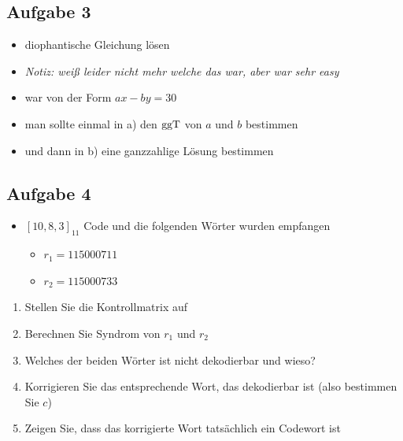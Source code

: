 \subsection{Aufgabe 3}
\begin{aufgabe}[Aufgabe 3]
\begin{itemize}
  \item diophantische Gleichung lösen
  \item \textit{Notiz: weiß leider nicht mehr welche das war, aber war sehr easy}
  \item war von der Form $a x - b y = 30$
  \item man sollte einmal in a) den $\operatorname{ggT}$ von $a$ und $b$ bestimmen
  \item und dann in b) eine ganzzahlige Lösung bestimmen
\end{itemize}
\end{aufgabe}

\subsection{Aufgabe 4}
\begin{aufgabe}[Aufgabe 4]
\begin{itemize}
  \item $[10, 8, 3]_{11}$ Code und die folgenden Wörter wurden empfangen
  \begin{itemize}
    \item $r_1 = 115000711$
    \item $r_2 = 115000733$
  \end{itemize}
\end{itemize}
\begin{enumerate}
  \item[a)] Stellen Sie die Kontrollmatrix auf
  \item[b)] Berechnen Sie Syndrom von $r_1$ und $r_2$
  \item[c)] Welches der beiden Wörter ist nicht dekodierbar und wieso?
  \item[d)] Korrigieren Sie das entsprechende Wort, das dekodierbar ist (also bestimmen Sie $c$)
  \item[e)] Zeigen Sie, dass das korrigierte Wort tatsächlich ein Codewort ist
\end{enumerate}
\end{aufgabe}
